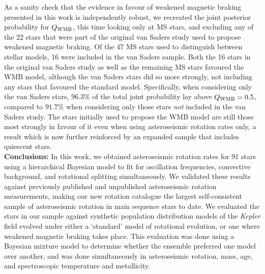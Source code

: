 \documentclass[12pt]{article}
\newcommand{\rtwo}[1]{{#1}}
\begin{document}
As a sanity check that the evidence in favour of weakened magnetic braking presented in this work is independently robust, we recreated the joint posterior probability for $Q_{\rm WMB}$, this time looking only at MS stars, and excluding any of the 22 stars that were part of the original van Saders study used to propose weakened magnetic braking. Of the 47 MS stars used to distinguish between stellar models, 16 were included in the van Saders sample. Both the 16 stars in the original van Saders study as well as the remaining MS stars favoured the WMB model, although the van Saders stars did so more strongly, not including any stars that favoured the standard model. Specifically, when considering only the van Saders stars, $96.3\%$ of the total joint probability lay above $Q_{\rm WMB} = 0.5$, compared to $91.7\%$ when considering only those stars \emph{not} included in the van Saders study. The stars initially used to propose the WMB model are still those most strongly in favour of it even when using asteroseismic rotation rates only, a result which is now further reinforced by an expanded sample that includes quiescent stars.\\


\textbf{Conclusions:} In this work, we obtained asteroseismic rotation rates for 91 stars using a hierarchical Bayesian model to fit for oscillation frequencies, convective background, and rotational splitting simultaneously. We validated these results against previously published and unpublished asteroseismic rotation measurements, making our new rotation catalogue the largest self-consistent sample of asteroseismic rotation in main sequence stars to date. We evaluated the stars in our sample against synthetic population \rtwo{distribution} models of the \textit{Kepler} field evolved under either a `standard' model of rotational evolution, or one where weakened magnetic braking takes place. This evaluation was done using a Bayesian mixture model to determine whether the ensemble preferred one model over another, and was done simultaneously in asteroseismic rotation, mass, age, and spectroscopic temperature and metallicity.\\
\end{document}
